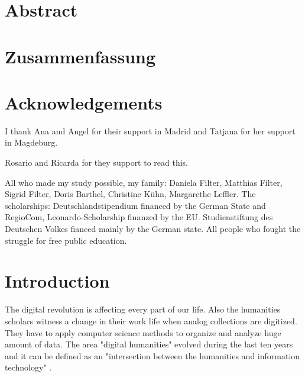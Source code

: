 \documentclass[11pt]{report}
\begin{document}


\renewcommand{\thepage}{\roman{page}}%

\newpage
\thispagestyle{empty}
\mbox{}

\chapter*{Abstract}
\blindtext

\newpage
\thispagestyle{empty}
\mbox{}

\chapter*{Zusammenfassung}
\blindtext

\newpage
\thispagestyle{empty}
\mbox{}

\chapter*{Acknowledgements}
I thank Ana and Angel for their support in Madrid and Tatjana for her support in Magdeburg.

Rosario and Ricarda for they support to read this.

All who made my study possible,
my family: Daniela Filter, Matthias Filter, Sigrid Filter, Doris Barthel, Christine Kühn, Margarethe Leffler.
The scholarships: Deutschlandstipendium financed by the German State and RegioCom, Leonardo-Scholarship finanzed by the EU. Studienstiftung des Deutschen Volkes fianced mainly by the German state. 
All people who fought the struggle for free public education.

\newpage
\thispagestyle{empty}
\mbox{}

\tableofcontents
\newpage

\listoffigures

\printglossary[type=\acronymtype]

\newpage
\thispagestyle{empty}
\mbox{}

\chapter{Introduction}
\label{Introduction}

\renewcommand{\thepage}{\arabic{page}}
\setcounter{page}{1}

The digital revolution is affecting every part of our life. Also the humanities scholars witness a change in their work life when analog collections are digitized. They have to apply computer science methods to organize and analyze huge amount of data. The area "digital humanities" evolved during the last ten years and it can be defined as an "intersection between the humanities and information technology" \cite{Svensson2010}.\\
\end{document}
